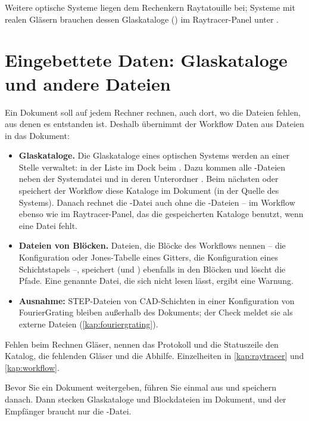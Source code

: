 Weitere optische Systeme liegen dem Rechenkern Raytatouille bei; Systeme mit realen Gläsern
brauchen dessen Glaskataloge () im Raytracer-Panel unter .

\section{Eingebettete Daten: Glaskataloge und andere Dateien}\label{sec:glaskataloge}

Ein Dokument soll auf jedem Rechner rechnen, auch dort, wo die Dateien fehlen, aus denen es
entstanden ist. Deshalb übernimmt der Workflow Daten aus Dateien in das Dokument:

\begin{itemize}
  \item \textbf{Glaskataloge.} Die Glaskataloge eines optischen Systems werden an einer Stelle
    verwaltet: in der Liste  im Dock  beim
    . Dazu kommen alle -Dateien neben der Systemdatei und in deren
    Unterordner . Beim nächsten  oder 
    speichert der Workflow diese Kataloge im Dokument (in der Quelle des Systems). Danach
    rechnet die -Datei auch ohne die -Dateien -- im Workflow ebenso
    wie im Raytracer-Panel, das die gespeicherten Kataloge benutzt, wenn eine Datei fehlt.
  \item \textbf{Dateien von Blöcken.} Dateien, die Blöcke des Workflows nennen -- die
    Konfiguration oder Jones-Tabelle eines Gitters, die Konfiguration eines Schichtstapels --,
    speichert  (und ) ebenfalls in den Blöcken und löscht
    die Pfade. Eine genannte Datei, die sich nicht lesen lässt, ergibt eine Warnung.
  \item \textbf{Ausnahme:} STEP-Dateien von CAD-Schichten in einer Konfiguration von
    FourierGrating
    bleiben außerhalb des Dokuments; der Check meldet sie als externe Dateien
    (\autoref{kap:fouriergrating}).
\end{itemize}

Fehlen beim Rechnen Gläser, nennen das Protokoll und die Statuszeile den Katalog, die
fehlenden Gläser und die Abhilfe. Einzelheiten in \autoref{kap:raytracer} und
\autoref{kap:workflow}.

\begin{tipp}
Bevor Sie ein Dokument weitergeben, führen Sie einmal  aus und speichern
danach. Dann stecken Glaskataloge und Blockdateien im Dokument, und der Empfänger braucht nur
die -Datei.
\end{tipp}

